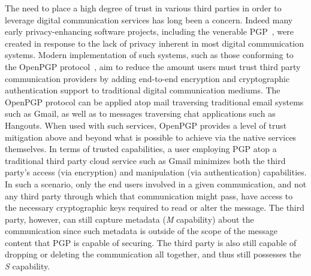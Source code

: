 The need to place a high degree of trust in various third parties in
order to leverage digital communication services has long been a
concern. Indeed many early privacy-enhancing software projects,
including the venerable PGP~\cite{zimmermann-pgp10,
  zimmermann-pgpsource}, were created in response to the lack of
privacy inherent in most digital communication systems. Modern
implementation of such systems, such as those conforming to the
OpenPGP protocol~\cite{callas2007}, aim to reduce the amount users
must trust third party communication providers by adding end-to-end
encryption and cryptographic authentication support to traditional
digital communication mediums. The OpenPGP protocol can be applied
atop mail traversing traditional email systems such as Gmail, as well
as to messages traversing chat applications such as Hangouts. When
used with such services, OpenPGP provides a level of trust mitigation
above and beyond what is possible to achieve via the native services
themselves. In terms of trusted capabilities, a user employing PGP
atop a traditional third party cloud service such as Gmail minimizes
both the third party's access (via encryption) and manipulation (via
authentication) capabilities. In such a scenario, only the end users
involved in a given communication, and not any third party through
which that communication might pass, have access to the necessary
cryptographic keys required to read or alter the message. The third
party, however, can still capture metadata (\emph{M} capability) about
the communication since such metadata is outside of the scope of the
message content that PGP is capable of securing. The third party is
also still capable of dropping or deleting the communication all
together, and thus still possesses the \emph{S} capability.

